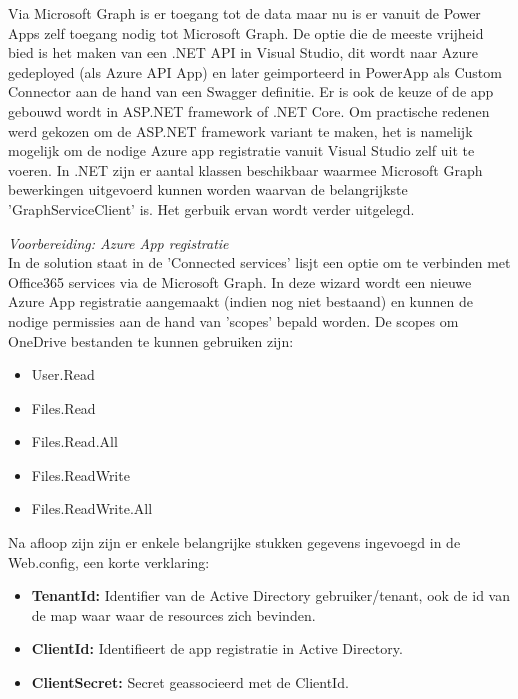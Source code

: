 Via Microsoft Graph is er toegang tot de data maar nu is er vanuit de Power Apps zelf toegang nodig tot Microsoft Graph. De optie die de meeste vrijheid bied is het maken van een .NET API in Visual Studio, dit wordt naar Azure gedeployed (als Azure API App) en later geimporteerd in PowerApp als Custom Connector aan de hand van een Swagger definitie. Er is ook de keuze of de app gebouwd wordt in ASP.NET framework of .NET Core. Om practische redenen werd gekozen om de ASP.NET framework variant te maken, het is namelijk mogelijk om de nodige Azure app registratie vanuit Visual Studio zelf uit te voeren.
In .NET zijn er aantal klassen beschikbaar waarmee Microsoft Graph bewerkingen uitgevoerd kunnen worden waarvan de belangrijkste 'GraphServiceClient' is. Het gerbuik ervan wordt verder uitgelegd.

\textit{Voorbereiding: Azure App registratie}\\
In de solution staat in de 'Connected services' lisjt een optie om te verbinden met Office365 services via de Microsoft Graph. In deze wizard wordt een nieuwe Azure App registratie aangemaakt (indien nog niet bestaand) en kunnen de nodige permissies aan de hand van 'scopes' bepald worden. De scopes om OneDrive bestanden te kunnen gebruiken zijn:
\begin{itemize}
    \item User.Read 
    \item Files.Read 
    \item Files.Read.All 
    \item Files.ReadWrite 
    \item Files.ReadWrite.All
\end{itemize}

Na afloop zijn zijn er enkele belangrijke stukken gegevens ingevoegd in de Web.config, een korte verklaring:
\begin{itemize}
    \item \textbf{TenantId:} Identifier van de Active Directory gebruiker/tenant, ook de id van de map waar waar de resources zich bevinden.
    \item \textbf{ClientId:} Identifieert de app registratie in Active Directory.
    \item \textbf{ClientSecret:} Secret geassocieerd met de ClientId.
\end{itemize}

